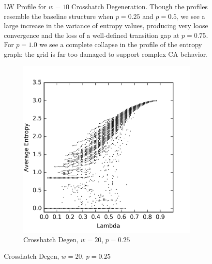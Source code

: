 \documentclass[a4paper,11pt]{article}
\begin{document}
\begin{figure}[htp]
\caption[Crosshatch Langton-Wootters Profile, $w=10$]{
  LW Profile for $w=10$ Crosshatch Degeneration. Though the profiles resemble the baseline structure when $p=0.25$ and $p=0.5$, we see a large increase in the variance of entropy values, producing very loose convergence and the loss of a well-defined transition gap at $p=0.75$. For $p=1.0$ we see a complete collapse in the profile of the entropy graph; the grid is far too damaged to support complex CA behavior.
}
\label{fig:lw_ch_10}
\end{figure}

\begin{figure}[htp]
\centering
\begin{subfigure}[t]{0.4\textwidth}
  \includegraphics[width=\textwidth]{ch6_figs/ch_w20_p25_entropy_scatter}
  \caption{Crosshatch Degen, $w=20$, $p=0.25$}


\end{subfigure}
\end{figure}
\end{document}
